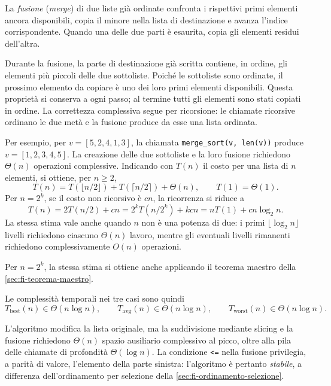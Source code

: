 La \emph{fusione} (\emph{merge}) di due liste già ordinate confronta
i rispettivi primi elementi ancora disponibili, copia il minore
nella lista di destinazione e avanza l'indice corrispondente. Quando
una delle due parti è esaurita, copia gli elementi residui dell'altra.



Durante la fusione, la parte di destinazione già scritta contiene,
in ordine, gli elementi più piccoli delle due sottoliste.
Poiché le sottoliste sono ordinate, il prossimo elemento da copiare
è uno dei loro primi elementi disponibili. Questa proprietà si
conserva a ogni passo; al termine tutti gli elementi sono stati
copiati in ordine. La correttezza complessiva segue per ricorsione:
le chiamate ricorsive ordinano le due metà e la fusione produce
da esse una lista ordinata.

Per esempio, per \(v=[5,2,4,1,3]\), la chiamata
\texttt{merge\_sort(v, len(v))} produce \(v=[1,2,3,4,5]\).
La creazione delle due sottoliste e la loro fusione richiedono
\(\Theta(n)\) operazioni complessive. Indicando con \(T(n)\) il costo
per una lista di \(n\) elementi, si ottiene, per \(n\ge2\),
\[
  T(n)=T(\lfloor n/2\rfloor)
       +T(\lceil n/2\rceil)+\Theta(n),
  \qquad T(1)=\Theta(1).
\]
Per \(n=2^k\), se il costo non ricorsivo è \(cn\), la ricorrenza
si riduce a
\[
  T(n)=2T(n/2)+cn
       =2^kT(n/2^k)+kcn
       =nT(1)+cn\log_2 n.
\]
La stessa stima vale anche quando \(n\) non è una potenza di due:
i primi \(\lfloor\log_2 n\rfloor\) livelli richiedono ciascuno
\(\Theta(n)\) lavoro, mentre gli eventuali livelli rimanenti
richiedono complessivamente \(O(n)\) operazioni.

Per \(n=2^k\), la stessa stima si ottiene anche applicando
il teorema maestro della \cref{sec:fi-teorema-maestro}.

Le complessità temporali nei tre casi sono quindi
\[
  T_{\mathrm{best}}(n)\in\Theta(n\log n),\qquad
  T_{\mathrm{avg}}(n)\in\Theta(n\log n),\qquad
  T_{\mathrm{worst}}(n)\in\Theta(n\log n).
\]

L'algoritmo modifica la lista originale, ma la suddivisione mediante
slicing e la fusione richiedono \(\Theta(n)\) spazio ausiliario
complessivo al picco, oltre alla pila delle chiamate di profondità
\(\Theta(\log n)\). La condizione \lstinline|<=| nella fusione
privilegia, a parità di valore, l'elemento della parte sinistra:
l'algoritmo è pertanto \emph{stabile}, a differenza dell'ordinamento
per selezione della \cref{sec:fi-ordinamento-selezione}.

